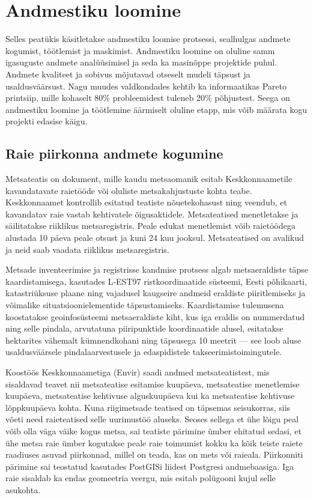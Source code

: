 \section{Andmestiku loomine}
Selles peatükis käsitletakse andmestiku loomise protsessi, sealhulgas andmete kogumist, töötlemist ja maskimist. Andmestiku loomine on oluline samm igasuguste andmete analüüsimisel ja seda ka masinõppe projektide puhul. Andmete kvaliteet ja sobivus mõjutavad otseselt mudeli täpsust ja usaldusväärsust. Nagu muudes valdkondades kehtib ka informaatikas Pareto printsiip, mille kohaselt 80\% probleemidest tuleneb 20\% põhjustest. Seega on andmestiku loomine ja töötlemine äärmiselt oluline etapp, mis võib määrata kogu projekti edasise käigu.

\subsection{Raie piirkonna andmete kogumine}
Metsateatis on dokument, mille kaudu metsaomanik esitab Keskkonnaametile
kavandatavate raietööde või oluliste metsakahjustuste kohta teabe. Keskkonnaamet
kontrollib esitatud teatiste nõuetekohasust ning veendub, et kavandatav raie
vastab kehtivatele õigusaktidele. Metsateatised menetletakse ja säilitatakse
riiklikus metsaregistris. Peale edukat menetlemist võib raietöödega alustada 10 päeva peale otsust ja kuni 24 kuu jooksul. \cite{MetsateatisJaMetsaregister} Metsateatised on avalikud ja neid saab vaadata riiklikus metsaregistris.

Metsade inventeerimise ja registrisse kandmise protsess algab metsaeraldiste
täpse kaardistamisega, kasutades L‑EST97 ristkoordinaatide süsteemi, Eesti
põhikaarti, katastriüksuse plaane ning vajadusel kaugseire andmeid eraldiste
piiritlemiseks ja võimalike situatsioonielementide täpsustamiseks. Kaardistamise
tulemusena koostatakse geoinfosüsteemi metsaeraldiste kiht, kus iga eraldis on
nummerdatud ning selle pindala, arvutatuna piiripunktide koordinaatide alusel, 
esitatakse hektarites vähemalt kümnendkohani ning täpsusega 10 meetrit --- see
loob aluse usaldusväärsele pindalaarvestusele ja edaspidistele
takseerimistoimingutele. \cite{MetsaKorraldamiseJuhend}

Koostöös Keskkonnaametiga (Envir) saadi andmed metsateatistest, mis sisaldavad teavet nii metsateatise esitamise kuupäeva, metsateatise menetlemise kuupäeva, metsateatise kehtivuse alguskuupäeva kui ka metsateatise kehtivuse lõppkuupäeva kohta. Kuna riigimetsade teatised on täpsemas seisukorras, siis võeti need raieteatised selle uurimustöö aluseks. Seoses sellega et ühe lõigu peal võib olla väga väike kogus metsa, sai teatiste pärimine ümber ehitatud sedasi, et ühe metsa raie ümber kogutakse peale raie toimumist kokku ka kõik teiste raiete raadiuses asuvad piirkonnad, millel on teada, kas on mets või raieala. Piirkonniti pärimine sai teostatud kasutades PostGISi liidest Postgresi andmebaasiga. Iga raie sisaldab ka endas geomeetria veergu, mis esitab polügooni kujul selle asukohta. 

